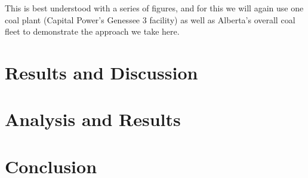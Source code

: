 \documentclass[12pt]{article}
\begin{document}
This is best understood with a series of figures, and for this we will again use one coal plant (Capital Power's Genessee 3 facility) as well as Alberta's overall coal fleet to demonstrate the approach we take here.










\section{Results and Discussion}




\section{Analysis and Results}

\section{Conclusion}




\end{document}

